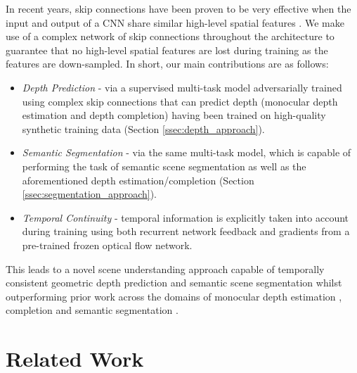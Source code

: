 \documentclass[10pt,twocolumn,letterpaper]{article}
\begin{document}
In recent years, skip connections have been proven to be very effective when the input and output of a CNN share similar high-level spatial features \cite{orhan2017skip, ronneberger2015u, tong2017image, yamanaka2017fast}. We make use of a complex network of skip connections throughout the architecture to guarantee that no high-level spatial features are lost during training as the features are down-sampled. In short, our main contributions are as follows:\vspace{-0.12cm}
\begin{itemize} 
	\setlength\itemsep{1.2mm}
	\item \textit{Depth Prediction} - via a supervised multi-task model adversarially trained using complex skip connections that can predict depth (monocular depth estimation and depth completion) having been trained on high-quality synthetic training data \cite{RosCVPR16} (Section \ref{ssec:depth_approach}).\vspace{-0.22cm}
	\item \textit{Semantic Segmentation} - via the same multi-task model, which is capable of performing the task of semantic scene segmentation as well as the aforementioned depth estimation/completion (Section \ref{ssec:segmentation_approach}).\vspace{-0.22cm}
	\item \textit{Temporal Continuity} - temporal information is explicitly taken into account during training using both recurrent network feedback and gradients from a pre-trained frozen optical flow network.\vspace{-0.22cm}
\end{itemize}

This leads to a novel scene understanding approach capable of temporally consistent geometric depth prediction and semantic scene segmentation whilst outperforming prior work across the domains of monocular depth estimation \cite{atapour2018real, eigen2014depth, monodepth17, liu2016learning, zhan2018unsupervised, zhou2017unsupervised}, 
completion \cite{abarghouei16filling, iizuka2017globally, liu2012guided, yu2018generative} and semantic segmentation \cite{badrinarayanan2015segnet, chen2018deeplab, kendall2017bayesian, liu2015semantic, long2015fully, noh2015learning, uhrig2016pixel, visin2016reseg, zheng2015conditional}.\vspace{-0.05cm}

\section{Related Work}
\label{sec:related}\vspace{-0.10cm}
\end{document}

